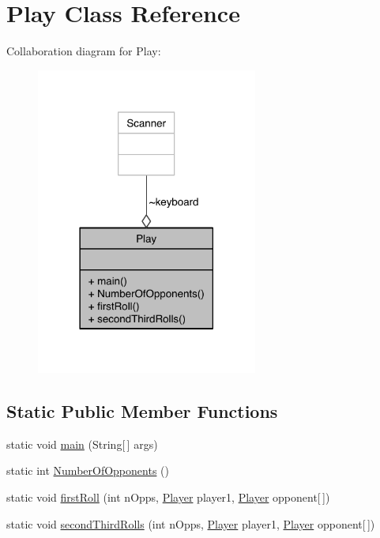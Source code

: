 \hypertarget{class_play}{\section{Play Class Reference}
\label{class_play}
}


Collaboration diagram for Play\-:\nopagebreak
\begin{figure}[H]
\begin{center}
\leavevmode
\includegraphics[width=206pt]{class_play__coll__graph}
\end{center}
\end{figure}
\subsection*{Static Public Member Functions}
\begin{DoxyCompactItemize}
\item 
static void \hyperlink{class_play_a1d6f1ee4bcb53ff10620aa60e1cb5396}{main} (String\mbox{[}$\,$\mbox{]} args)
\item 
static int \hyperlink{class_play_aa5e07c98111d810c1874d6c2fca8c4c7}{Number\-Of\-Opponents} ()
\item 
static void \hyperlink{class_play_a742c10e84b76714dcf4ce34194a69563}{first\-Roll} (int n\-Opps, \hyperlink{class_player}{Player} player1, \hyperlink{class_player}{Player} opponent\mbox{[}$\,$\mbox{]})
\item 
static void \hyperlink{class_play_a9ea5cb7c71895dd961ddcedb880a0ca9}{second\-Third\-Rolls} (int n\-Opps, \hyperlink{class_player}{Player} player1, \hyperlink{class_player}{Player} opponent\mbox{[}$\,$\mbox{]})
\end{DoxyCompactItemize}
